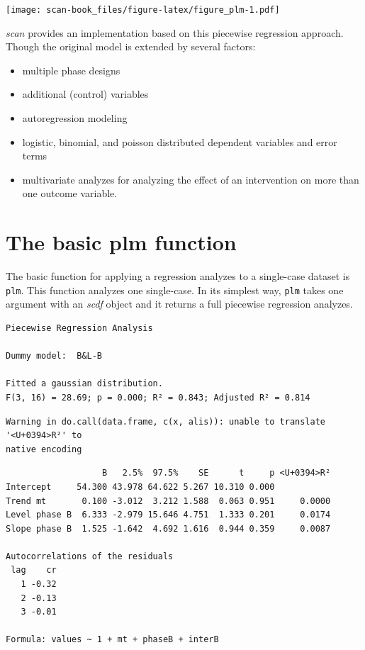 \documentclass[
]{book}
\newenvironment{Shaded}{\begin{snugshade}}{\end{snugshade}}
\newcommand{\FunctionTok}[1]{\textcolor[rgb]{0.00,0.00,0.00}{#1}}
\newcommand{\NormalTok}[1]{#1}
\newcommand{\SpecialCharTok}[1]{\textcolor[rgb]{0.00,0.00,0.00}{#1}}
\providecommand{\tightlist}{%
  \setlength{\itemsep}{0pt}\setlength{\parskip}{0pt}}
\begin{document}
\texttt{[image: scan-book\_files/figure-latex/figure\_plm-1.pdf]}

\emph{scan} provides an implementation based on this piecewise regression approach. Though the original model is extended by several factors:

\begin{itemize}
\tightlist
\item
  multiple phase designs
\item
  additional (control) variables
\item
  autoregression modeling
\item
  logistic, binomial, and poisson distributed dependent variables and error terms
\item
  multivariate analyzes for analyzing the effect of an intervention on more than one outcome variable.
\end{itemize}

\hypertarget{the-basic-plm-function}{%
\section{The basic plm function}\label{the-basic-plm-function}}

The basic function for applying a regression analyzes to a single-case dataset is \texttt{plm}. This function analyzes one single-case. In its simplest way, \texttt{plm} takes one argument with an \emph{scdf} object and it returns a full piecewise regression analyzes.

\begin{Shaded}
\end{Shaded}

\begin{verbatim}
Piecewise Regression Analysis

Dummy model:  B&L-B 

Fitted a gaussian distribution.
F(3, 16) = 28.69; p = 0.000; R² = 0.843; Adjusted R² = 0.814
\end{verbatim}

\begin{verbatim}
Warning in do.call(data.frame, c(x, alis)): unable to translate '<U+0394>R²' to
native encoding
\end{verbatim}

\begin{verbatim}
                   B   2.5%  97.5%    SE      t     p <U+0394>R²
Intercept     54.300 43.978 64.622 5.267 10.310 0.000           
Trend mt       0.100 -3.012  3.212 1.588  0.063 0.951     0.0000
Level phase B  6.333 -2.979 15.646 4.751  1.333 0.201     0.0174
Slope phase B  1.525 -1.642  4.692 1.616  0.944 0.359     0.0087

Autocorrelations of the residuals
 lag    cr
   1 -0.32
   2 -0.13
   3 -0.01

Formula: values ~ 1 + mt + phaseB + interB
\end{verbatim}
\end{document}
